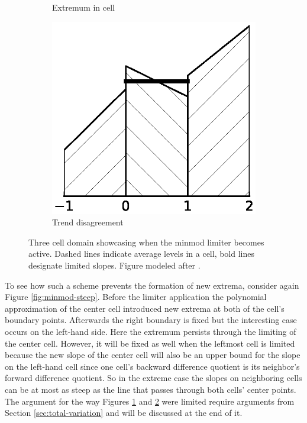 \begin{figure}
\begin{subfigure}{0.27\textwidth}
    \caption{Extremum in cell}
    \label{fig:minmod-extremum}
  \end{subfigure}
  \hfill
  \begin{subfigure}{0.27\textwidth}
    \centering
    \includegraphics[width=\textwidth]{figures/minmod-c}
    \caption{Trend disagreement}
    \label{fig:minmod-trend}
  \end{subfigure}
  \caption{Three cell domain showcasing when the minmod limiter becomes active. Dashed lines indicate average levels in a cell, bold lines designate limited slopes. Figure modeled after \cite[Figure 3]{VanLeer1979}.}
  \label{fig:minmod}
\end{figure}

To see how such a scheme prevents the formation of new extrema, consider again Figure \ref{fig:minmod-steep}.
Before the limiter application the polynomial approximation of the center cell introduced new extrema at both of the cell's boundary points.
Afterwards the right boundary is fixed but the interesting case occurs on the left-hand side.
Here the extremum persists through the limiting of the center cell.
However, it will be fixed as well when the leftmost cell is limited because the new slope of the center cell will also be an upper bound for the slope on the left-hand cell since one cell's backward difference quotient is its neighbor's forward difference quotient.
So in the extreme case the slopes on neighboring cells can be at most as steep as the line that passes through both cells' center points.
The argument for the way Figures \ref{fig:minmod-extremum} and \ref{fig:minmod-trend} were limited require arguments from Section \ref{sec:total-variation} and will be discussed at the end of it.
